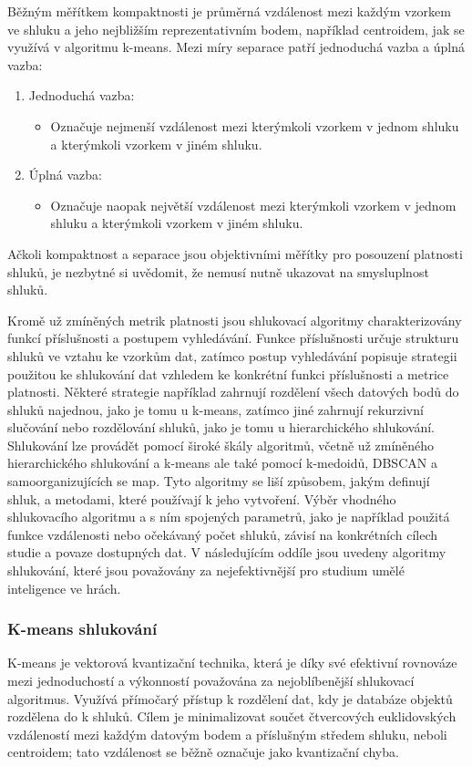 Běžným měřítkem kompaktnosti je průměrná vzdálenost mezi každým vzorkem ve shluku a jeho nejbližším reprezentativním bodem, například centroidem, jak se využívá v algoritmu k-means. Mezi míry separace patří jednoduchá vazba a úplná vazba:
\begin{enumerate}
	\item Jednoduchá vazba:
	\begin{itemize}
		\item Označuje nejmenší vzdálenost mezi kterýmkoli vzorkem v jednom shluku a kterýmkoli vzorkem v jiném shluku. 
	\end{itemize} 
	\item Úplná vazba:
	\begin{itemize}
		\item Označuje naopak největší vzdálenost mezi kterýmkoli vzorkem v jednom shluku a kterýmkoli vzorkem v jiném shluku.
	\end{itemize} 
\end{enumerate}

Ačkoli kompaktnost a separace jsou objektivními měřítky pro posouzení platnosti shluků, je nezbytné si uvědomit, že nemusí nutně ukazovat na smysluplnost shluků.

\newpage

Kromě už zmíněných metrik platnosti jsou shlukovací algoritmy charakterizovány funkcí příslušnosti a postupem vyhledávání. Funkce příslušnosti určuje strukturu shluků ve vztahu ke vzorkům dat, zatímco postup vyhledávání popisuje strategii použitou ke shlukování dat vzhledem ke konkrétní funkci příslušnosti a metrice platnosti. Některé strategie například zahrnují rozdělení všech datových bodů do shluků najednou, jako je tomu u k-means, zatímco jiné zahrnují rekurzivní slučování nebo rozdělování shluků, jako je tomu u hierarchického shlukování. Shlukování lze provádět pomocí široké škály algoritmů, včetně už zmíněného hierarchického shlukování a k-means ale také pomocí k-medoidů, DBSCAN a samoorganizujících se map. Tyto algoritmy se liší způsobem, jakým definují shluk, a metodami, které používají k jeho vytvoření. Výběr vhodného shlukovacího algoritmu a s ním spojených parametrů, jako je například použitá funkce vzdálenosti nebo očekávaný počet shluků, závisí na konkrétních cílech studie a povaze dostupných dat. V následujícím oddíle jsou uvedeny algoritmy shlukování, které jsou považovány za nejefektivnější pro studium umělé inteligence ve hrách.

\subsubsection{K-means shlukování}
K-means\cite{Macqueen1967} je vektorová kvantizační technika, která je díky své efektivní rovnováze mezi jednoduchostí a výkonností považována za nejoblíbenější shlukovací algoritmus. Využívá přímočarý přístup k rozdělení dat, kdy je databáze objektů rozdělena do k shluků. Cílem je minimalizovat součet čtvercových euklidovských vzdáleností mezi každým datovým bodem a příslušným středem shluku, neboli centroidem; tato vzdálenost se běžně označuje jako kvantizační chyba.

